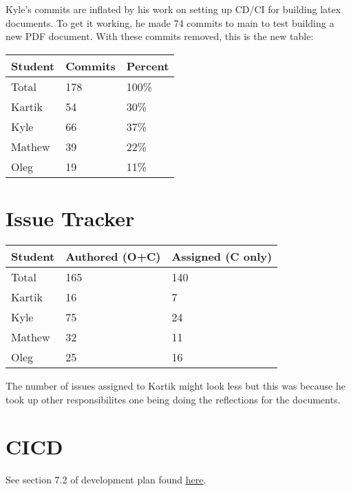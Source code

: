 \documentclass{article}
\begin{document}
Kyle's commits are inflated by his work on setting up CD/CI for building latex documents. To get it working, he made 74 commits to main to test building a new PDF document. With these commits removed, this is the new table:\\
\begin{table}[H]
    \centering
    \begin{tabular}{lll}
    \toprule
    \textbf{Student} & \textbf{Commits} & \textbf{Percent}\\
    \midrule
    Total & 178 & 100\% \\
    Kartik & 54 & 30\%\\
    Kyle   & 66 & 37\%\\
    Mathew & 39 & 22\%\\
    Oleg   & 19 & 11\%\\
    \bottomrule
    \end{tabular}
    \end{table}
\section{Issue Tracker}


\begin{table}[H]
\centering
\begin{tabular}{lll}
\toprule
\textbf{Student} & \textbf{Authored (O+C)} & \textbf{Assigned (C only)}\\
\midrule
Total & 165 & 140 \\
Kartik & 16 & 7\\
Kyle   & 75 & 24\\
Mathew & 32 & 11\\
Oleg   & 25 & 16\\
\bottomrule
\end{tabular}
\end{table}

The number of issues assigned to Kartik might look less but this was because he took up other responsibilites one being doing the reflections for the documents.\\

\section{CICD}

See section 7.2 of development plan found \href{https://github.com/OKKM-insights/OKKM.insights/blob/main/docs/DevelopmentPlan/DevelopmentPlan.pdf}{here}.

\end{document}
